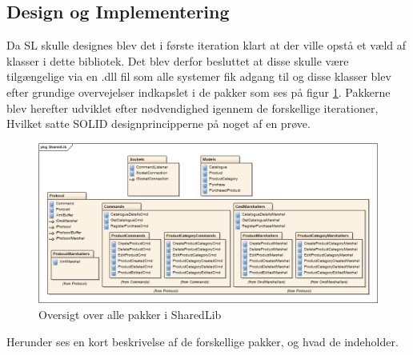 \subsection{Design og Implementering}

Da \gls{SL} skulle designes blev det i første iteration klart at der ville opstå et væld af klasser i dette bibliotek. Det blev derfor besluttet at disse skulle være tilgængelige via en .dll fil som alle systemer fik adgang til og disse klasser blev efter grundige overvejelser indkapslet i de pakker som ses på figur \ref{fig:oversigtSL}. Pakkerne blev herefter udviklet efter nødvendighed igennem de forskellige iterationer, Hvilket satte SOLID designprincipperne på noget af en prøve.

\begin{figure}[!h]
    \centering
    \includegraphics[width=1.0\textwidth]{Systemdesign/SharedLib/Images/SharedLib_Package2.png}
    \caption{Oversigt over alle pakker i SharedLib}
    \label{fig:oversigtSL}
\end{figure}

Herunder ses en kort beskrivelse af de forskellige pakker, og hvad de indeholder.

